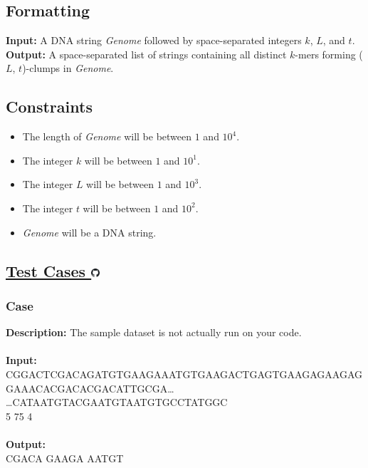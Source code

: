 \documentclass{article}
\newcommand{\code}[1]{{\fontfamily{pcr}\selectfont #1}}
\newcommand{\gitlogo}{\includegraphics[height=12.5]{c0/gitlogo.png}}
\begin{document}
\subsection*{Formatting}
\textbf{Input:} A DNA string \emph{Genome} followed by space-separated integers $k$, $L$, and $t$.\\
\noindent \textbf{Output:} A space-separated list of strings containing all distinct $k$-mers forming ($L$, $t$)-clumps in \emph{Genome}.

\subsection*{Constraints}
\begin{itemize}
    \item The length of \emph{Genome} will be between $1$ and $10^4$.
    \item The integer $k$ will be between $1$ and $10^1$.
    \item The integer $L$ will be between $1$ and $10^3$.
    \item The integer $t$ will be between $1$ and $10^2$.
    \item \emph{Genome} will be a DNA string.
\end{itemize}
\pagebreak

\subsection*{\href{https://github.com/rjeveloff/BA_problemregister/tree/main/test_cases/chapter_1/1E}{Test Cases \gitlogo}}
\subsubsection*{Case }
\hline \vspace{5}
\textbf{Description:} The sample dataset is not actually run on your code.\\ \\
\noindent \textbf{Input:}\\
\code{CGGACTCGACAGATGTGAAGAAATGTGAAGACTGAGTGAAGAGAAGAGGAAACACGACACGACATTGCGA\dots\\
\dots CATAATGTACGAATGTAATGTGCCTATGGC\\5 75 4}\\ \\
\noindent \textbf{Output:}\\
\code{CGACA GAAGA AATGT}
\end{document}
